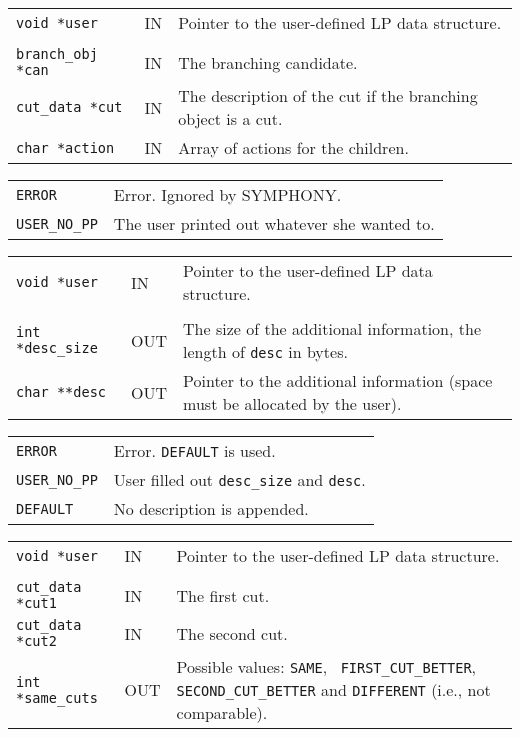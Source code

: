 \documentclass[twoside,11pt]{article}
\begin{document}
{\newpage
\clearpage
\samepage \begin{tabular}{llp{297.865pt}}
{\tt void *user} &  IN & Pointer to the user-defined LP data structure. \\ 
& & \\ 
{\tt branch\_obj *can} & IN & The branching candidate. \\ 
{\tt cut\_data *cut} & IN & The description of the cut if the
branching object is a cut. \\ 
{\tt char *action} & IN & Array of actions for the children. \\ 
\end{tabular}
}

{\newpage
\clearpage
\samepage \begin{tabular}{lp{371.195pt}}
{\tt ERROR} & Error. Ignored by {\sc SYMPHONY}. \\ 
{\tt USER\_NO\_PP} & The user printed out whatever she wanted to. \\ 
\end{tabular}
}

{\newpage
\clearpage
\samepage \begin{tabular}{llp{297.864pt}}
{\tt void *user} & IN & Pointer to the user-defined LP data structure. \\ 
& & \\ 
{\tt int *desc\_size} & OUT & The size of the additional information, the
length of {\tt *desc} in bytes. \\ 
{\tt char **desc} & OUT & Pointer to the additional information (space must be
allocated by the user).\\ 
\end{tabular}
}

{\newpage
\clearpage
\samepage \begin{tabular}{lp{371.195pt}}
{\tt ERROR} & Error. {\tt DEFAULT} is used. \\ 
{\tt USER\_NO\_PP} & User filled out {\tt *desc\_size} and {\tt *desc}.\\ 
{\tt DEFAULT} & No description is appended. \\ 
\end{tabular}
}

{\newpage
\clearpage
\samepage \begin{tabular}{llp{303.114pt}}
{\tt void *user} & IN & Pointer to the user-defined LP data structure.\\ 
& & \\ 
{\tt cut\_data *cut1} & IN & The first cut.\\ 
{\tt cut\_data *cut2} & IN & The second cut.\\ 
{\tt int *same\_cuts} & OUT & Possible values: {\tt SAME}, {\tt
FIRST\_CUT\_BETTER}, {\tt SECOND\_CUT\_BETTER} and {\tt DIFFERENT} (i.e., not
comparable).\\ 
\end{tabular}
}
\end{document}
